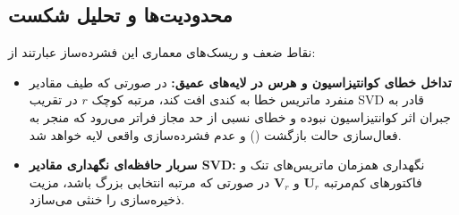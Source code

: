 \subsection{محدودیت‌ها و تحلیل شکست}
نقاط ضعف و ریسک‌های معماری این فشرده‌ساز عبارتند از:
\begin{itemize}
    \item \textbf{تداخل خطای کوانتیزاسیون و هرس در لایه‌های عمیق:} در صورتی که طیف مقادیر منفرد ماتریس خطا به کندی افت کند، مرتبه کوچک $r$ در تقریب SVD قادر به جبران اثر کوانتیزاسیون نبوده و خطای نسبی از حد مجاز فراتر می‌رود که منجر به فعال‌سازی حالت بازگشت () و عدم فشرده‌سازی واقعی لایه خواهد شد.
    \item \textbf{سربار حافظه‌ای نگهداری مقادیر SVD:} نگهداری همزمان ماتریس‌های تنک و فاکتورهای کم‌مرتبه $\mathbf{U}_r$ و $\mathbf{V}_r$ در صورتی که مرتبه انتخابی بزرگ باشد، مزیت ذخیره‌سازی را خنثی می‌سازد.
\end{itemize}
